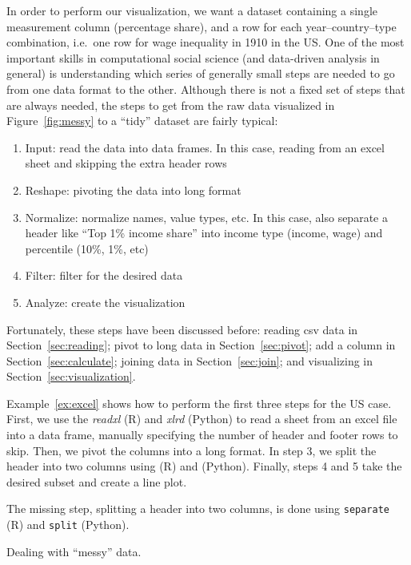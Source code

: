 In order to perform our visualization, we want a dataset containing a single measurement column (percentage share),
and a row for each year--country--type combination, i.e.\ one row for wage inequality in 1910 in the US.
One of the most important skills in computational social science (and data-driven analysis in general) is
understanding which series of generally small steps are needed to go from one data format to the other.
Although there is not a fixed set of steps that are always needed, the steps to get from the raw data visualized in Figure~\ref{fig:messy} to a ``tidy'' dataset are fairly typical:

\begin{enumerate}
  \item Input:  read the data into data frames. In this case, reading from an excel sheet and skipping the extra header rows
  \item Reshape: pivoting the data into long format
  \item Normalize: normalize names, value types, etc. In this case, also separate a header like ``Top 1\% income share'' into income type (income, wage) and percentile (10\%, 1\%, etc)
  \item Filter: filter for the desired data
  \item Analyze: create the visualization
\end{enumerate}

Fortunately, these steps have been discussed before: reading csv data in Section~\ref{sec:reading}; pivot to long data in Section~\ref{sec:pivot};
add a column in Section~\ref{sec:calculate}; joining data in Section~\ref{sec:join}; and visualizing in Section~\ref{sec:visualization}.

Example~\ref{ex:excel} shows how to perform the first three steps for the US case.
First, we use the \emph{readxl} (R) and \emph{xlrd} (Python) to read a sheet from an excel file into a data frame,
manually specifying the number of header and footer rows to skip.
 Then, we pivot the columns into a  long format.
In step 3, we split the header into two columns using  (R) and  (Python). Finally, steps 4 and 5 take the desired subset and create a line plot. 

The missing step, splitting a header into two columns, is done using \texttt{separate} (R) and \texttt{split} (Python).

\begin{ccsexample}
  \begin{tcolorbox}[title=Output]
    \texttt{[image: \{snippets/chapter06/excel2.r]}.png}
  \end{tcolorbox}
  \caption{Dealing with ``messy'' data.}\label{ex:excel}
\end{ccsexample}

